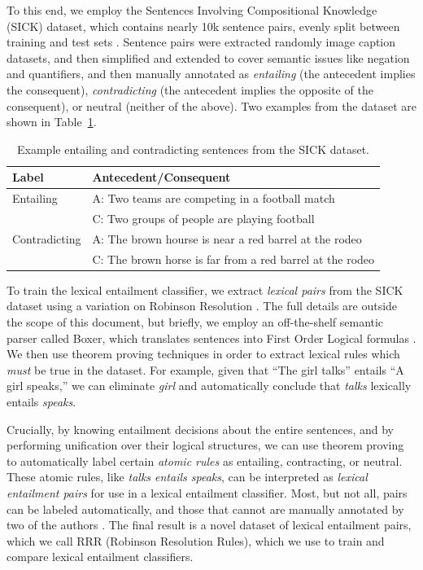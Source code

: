 \documentclass[12pt]{article}
\begin{document}
To this end, we employ the Sentences Involving Compositional Knowledge (SICK)
dataset, which contains nearly 10k sentence pairs, evenly split between
training and test sets \cite{marelli:2014:semeval}. Sentence pairs were
extracted randomly image caption datasets, and then simplified and extended to
cover semantic issues like negation and quantifiers, and then manually
annotated as {\em entailing} (the antecedent implies the consequent), {\em
contradicting} (the antecedent implies the opposite of the consequent), or
neutral (neither of the above). Two examples from the dataset are shown in
Table~\ref{tab:sickexample}.

\begin{table}
  \centering
  \begin{tabular}{|ll|}
    \hline
    {\bf Label} & {\bf Antecedent/Consequent}\\
    \hline
    Entailing & A: Two teams are competing in a football match\\
    & C: Two groups of people are playing football\\
    \hline
    Contradicting & A: The brown hourse is near a red barrel at the rodeo\\
    & C: The brown horse is far from a red barrel at the rodeo\\
    \hline
  \end{tabular}
  \caption{Example entailing and contradicting sentences from the SICK dataset.}
  \label{tab:sickexample}
\end{table}

To train the lexical entailment classifier, we extract {\em lexical pairs} from
the SICK dataset using a variation on Robinson Resolution \cite{robinson:1965:jacm}. The
full details are outside the scope of this document, but briefly, we employ
an off-the-shelf semantic parser called Boxer, which translates sentences into
First Order Logical formulas \cite{bos:2008:step}. We then use theorem proving
techniques in order to extract lexical rules which {\em must} be true in the dataset.
For example, given that ``The girl talks'' entails ``A girl speaks,'' we can
eliminate {\em girl} and automatically conclude that {\em talks} lexically
entails {\em speaks}.

Crucially, by knowing entailment decisions about the
entire sentences, and by performing unification over their logical structures,
we can use theorem proving to automatically label certain {\em atomic rules} as
entailing, contracting, or neutral. These atomic rules, like {\em talks entails speaks}, can
be interpreted as {\em lexical entailment pairs} for use in a lexical entailment
classifier. Most, but not all, pairs can be labeled automatically, and those
that cannot are manually annotated by two of the authors \cite{beltagy:2016:cl}.
The final result is a novel dataset of lexical entailment pairs, which we call
RRR (Robinson Resolution Rules), which we use to train and compare lexical
entailment classifiers.
\end{document}
